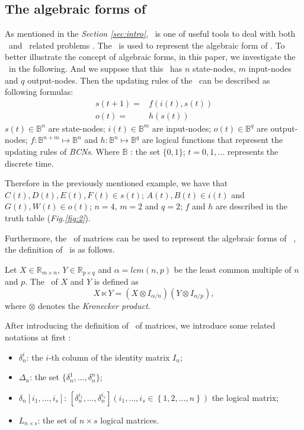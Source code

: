 \subsection{The algebraic forms of \BCNs}
As mentioned in the {\em Section \ref{sec:intro}}, \STP\ is one of useful tools to deal with  both \BNs\ and \BCNs\  related problems \cite{cheng2009controllability}. The \STP\ is used to represent the algebraic form of \BCN. To better illustrate the concept of algebraic forms, in this paper, we investigate the \BCN\ in the following. And we suppose that this \BCN\ has $n$ state-nodes, $m$ input-nodes and $q$ output-nodes. Then the updating rules of the \BCN\ can be described as following formulas:
\begin{equation}
\begin{split}
s(t+1)=&f(i(t),s(t))\\
o(t)=&h(s(t))
\end{split}
\label{equ:1}
\end{equation}
$s(t)\in \mathbb{B}^n$ are state-nodes; $i(t)\in \mathbb{B}^m$ are input-nodes; $o(t)\in \mathbb{B}^q$ are output-nodes; $f:\mathbb{B}^{n+m}\mapsto \mathbb{B}^n$ and $h:\mathbb{B}^n\mapsto \mathbb{B}^q$ are logical functions that represent the updating rules of {\em BCNs}. Where $\mathbb{B}$ : the set $\{0,1\}$; $t=0,1,\ldots$ represents the discrete time. 

Therefore in the previously mentioned example, we have that $C(t), D(t), E(t), F(t)\in s(t)$; $A(t), B(t)\in i(t)$ and $G(t), W(t)\in o(t)$; $n=4$, $m=2$ and $q=2$; $f$ and $h$ are described in the truth table ({\em Fig.\ref{fig:2}}). 

Furthermore, the \STP\ of matrices can be used to represent the algebraic forms of \BCNs\ \cite{cheng2009controllability}, the definition of \STP\ is as follows.

\begin{definition}[STP] 
	\cite{Cheng2011Analysis} Let $X\in\mathbb{R}_{m\times n}$, $Y\in\mathbb{R}_{p\times q}$ and $\alpha=lcm(n,p)$ be the least common multiple of $n$ and $p$. The \STP\ of $X$ and $Y$ is defined as \[X\ltimes Y=(X\otimes I_{\alpha/n})(Y\otimes I_{\alpha/p}),\] where $\otimes$ denotes the {\em Kronecker product}. 
\end{definition}

After introducing the definition of \STP\ of matrices,  we introduce some related notations at first \cite{Zhang2016Observability}:
\begin{itemize}
  \item $\delta^i_n$: the $i$-th column of the identity matrix $I_n$;
  \item $\Delta_n$: the set $\{\delta^1_n,\ldots,\delta^n_n \}$; 
  \item $\delta_n \left[i_1,\ldots,i_s\right]$: $\left[\delta^{i_1}_n,\ldots,\delta^{i_s}_n\right]\left(i_1,\ldots,i_s\in\left\{1,2,\ldots,n\right\}\right)$ the logical matrix;
  \item  $L_{n\times s}$: the set of $n\times s$ logical matrices.
\end{itemize}


